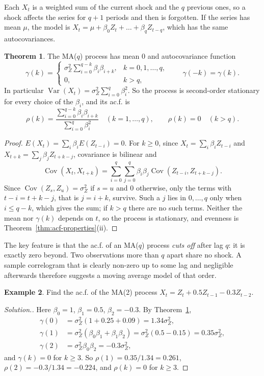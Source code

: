 \documentclass[11pt,a4paper]{article}
\theoremstyle{definition}
\newtheorem{thm}{Theorem}[subsection]
\newtheorem{exa}[thm]{Example}
\newenvironment{solution}
  {\renewcommand{\qedsymbol}{}\begin{proof}[\textit{Solution}.]}
  {\end{proof}}
\DeclareMathOperator{\Var}{Var}
\DeclareMathOperator{\Cov}{Cov}
\begin{document}
Each $X_t$ is a weighted sum of the current shock and the $q$ previous ones, so a shock affects the series for
$q + 1$ periods and then is forgotten. If the series has mean $\mu$, the model is $X_t = \mu + \beta_0Z_t + \dots + \beta_qZ_{t-q}$, which has the
same autocovariances.

\begin{thm}\label{thm:ma-acv}
The MA($q$) process has mean $0$ and autocovariance function
\[
\gamma(k) = \begin{cases} \sigma_Z^2\displaystyle\sum_{i=0}^{q-k}\beta_i\beta_{i+k} , & k = 0, 1, \dots, q , \\[2ex] 0 , & k > q , \end{cases}
\qquad \gamma(-k) = \gamma(k) .
\]
In particular $\Var(X_t) = \sigma_Z^2\sum_{i=0}^q\beta_i^2$. So the process is second-order stationary for every choice of the $\beta_i$, and its
ac.f. is
\[
\rho(k) = \frac{\sum_{i=0}^{q-k}\beta_i\beta_{i+k}}{\sum_{i=0}^q\beta_i^2} \quad (k = 1, \dots, q) , \qquad \rho(k) = 0 \quad (k > q) .
\]
\end{thm}

\begin{proof}
$E(X_t) = \sum_i\beta_iE(Z_{t-i}) = 0$. For $k \ge 0$, since $X_t = \sum_i\beta_iZ_{t-i}$ and $X_{t+k} = \sum_j\beta_jZ_{t+k-j}$, covariance is
bilinear and
\[
\Cov(X_t, X_{t+k}) = \sum_{i=0}^q\sum_{j=0}^q\beta_i\beta_j\Cov(Z_{t-i}, Z_{t+k-j}) .
\]
Since $\Cov(Z_s, Z_u) = \sigma_Z^2$ if $s = u$ and $0$ otherwise, only the terms with $t - i = t + k - j$, that is $j = i + k$, survive. Such a $j$ lies in
$0, \dots, q$ only when $i \le q - k$, which gives the sum; if $k > q$ there are no such terms. Neither the mean nor $\gamma(k)$ depends on
$t$, so the process is stationary, and evenness is Theorem~\ref{thm:acf-properties}(ii).
\end{proof}

The key feature is that the ac.f. of an MA($q$) process \emph{cuts off} after lag $q$: it is exactly zero beyond. Two
observations more than $q$ apart share no shock. A sample correlogram that is clearly non-zero up to some lag
and negligible afterwards therefore suggests a moving average model of that order.

\begin{exa}\label{exa:ma2}
Find the ac.f. of the MA(2) process $X_t = Z_t + 0.5Z_{t-1} - 0.3Z_{t-2}$.
\end{exa}

\begin{solution}
Here $\beta_0 = 1$, $\beta_1 = 0.5$, $\beta_2 = -0.3$. By Theorem~\ref{thm:ma-acv},
\begin{align*}
\gamma(0) &= \sigma_Z^2(1 + 0.25 + 0.09) = 1.34\sigma_Z^2 , \\
\gamma(1) &= \sigma_Z^2(\beta_0\beta_1 + \beta_1\beta_2) = \sigma_Z^2(0.5 - 0.15) = 0.35\sigma_Z^2 , \\
\gamma(2) &= \sigma_Z^2\beta_0\beta_2 = -0.3\sigma_Z^2 ,
\end{align*}
and $\gamma(k) = 0$ for $k \ge 3$. So $\rho(1) = 0.35/1.34 = 0.261$, $\rho(2) = -0.3/1.34 = -0.224$, and $\rho(k) = 0$ for $k \ge 3$.
\end{solution}
\end{document}
